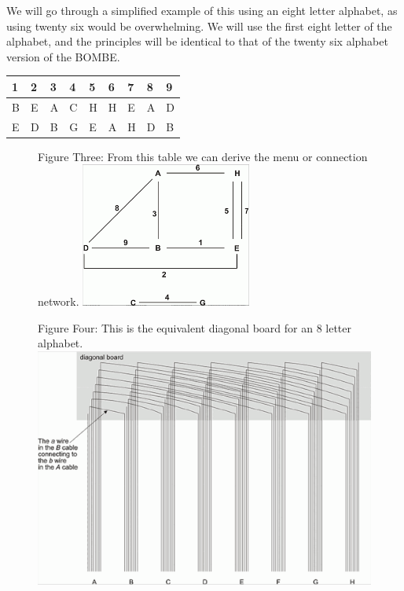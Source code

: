 \documentclass[12pt,a4paper]{article}
\begin{document}
We will go through a simplified example of this using an eight letter alphabet, as using twenty six would be overwhelming. We will use the first eight letter of the alphabet, and the principles will be identical to that of the twenty six alphabet version of the BOMBE.

\label{Crib and Ciphertext}
\begin{longtable}{ |p{1.25cm}|p{1.25cm}|p{1.25cm}|p{1.25cm}|p{1.25cm}|p{1.25cm}|p{1.25cm}|p{1.25cm}|p{1.25cm}| }\hline
1 & 2 & 3 & 4 & 5 & 6 & 7 & 8 & 9 \\ \hline\hline
B & E & A & C & H & H & E & A & D \\ \hline
E & D & B & G & E & A & H & D & B \\ \hline
\end{longtable}

\begin{figure}[h]
\centering
Figure Three: 
From this table we can derive the menu or connection network.
\includegraphics[width=0.5\textwidth]{BOMBEone.png}
\end{figure}

\begin{figure}[h]
\centering
Figure Four: 
This is the equivalent diagonal board for an 8 letter alphabet.
\includegraphics[width=\textwidth]{BOMBEtwo.png}
\end{figure}
\end{document}

